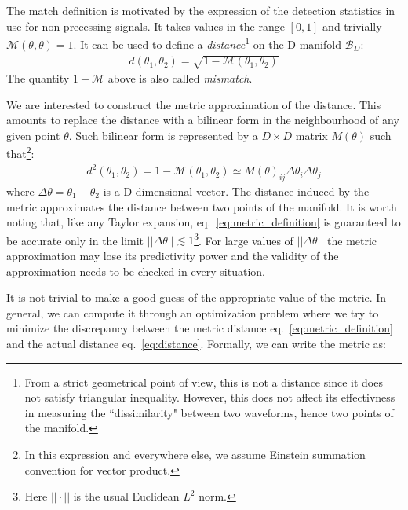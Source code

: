 \documentclass[twocolumn,showpacs,preprintnumbers,nofootinbib,prd,
superscriptaddress,10pt]{revtex4-2}
\begin{document}
The match definition is motivated by the expression of the detection statistics \cite{something} in use for non-precessing signals. It takes values in the range $[0,1]$ and trivially $\mathcal{M}(\theta,\theta) = 1$.
It can be used to define a {\it distance}\footnote{
From a strict geometrical point of view, this is not a distance since it does not satisfy triangular inequality. However, this does not affect its effectivness in measuring the ``dissimilarity" between two waveforms, hence two points of the manifold.}
on the D-manifold $\mathcal{B}_D$:
\begin{align}\label{eq:distance}
	d(\theta_1,\theta_2) = \sqrt{1 - \mathcal{M}(\theta_1,\theta_2)}
\end{align}
The quantity $1-\mathcal{M}$ above is also called {\it mismatch}.

We are interested to construct the metric approximation of the distance. This amounts to replace the distance with a bilinear form in the neighbourhood of any given point $\theta$. Such bilinear form is represented by a $D\times D$ matrix $M(\theta)$ such that\footnote{
In this expression and everywhere else, we assume Einstein summation convention for vector product.}:
\begin{align}\label{eq:metric_definition}
	d^2(\theta_1,\theta_2) = 1 - \mathcal{M}(\theta_1,\theta_2) \simeq M(\theta)_{ij} \Delta\theta_i \Delta\theta_j
\end{align}
where $\Delta\theta = \theta_1-\theta_2$ is a D-dimensional vector.
The distance induced by the metric approximates the distance between two points of the manifold.
It is worth noting that, like any Taylor expansion, eq.~\eqref{eq:metric_definition} is guaranteed to be accurate only in the limit $||\Delta\theta||\lesssim 1$\footnote{Here $||\cdot||$ is the usual Euclidean $L^2$ norm.}. For large values of $||\Delta\theta||$ the metric approximation may lose its predictivity power and the validity of the approximation needs to be checked in every situation.

It is not trivial to make a good guess of the appropriate value of the metric. In general, we can compute it through an optimization problem where we try to minimize the discrepancy between the metric distance eq.~\eqref{eq:metric_definition} and the actual distance eq.~\eqref{eq:distance}. Formally, we can write the metric as:
\end{document}
